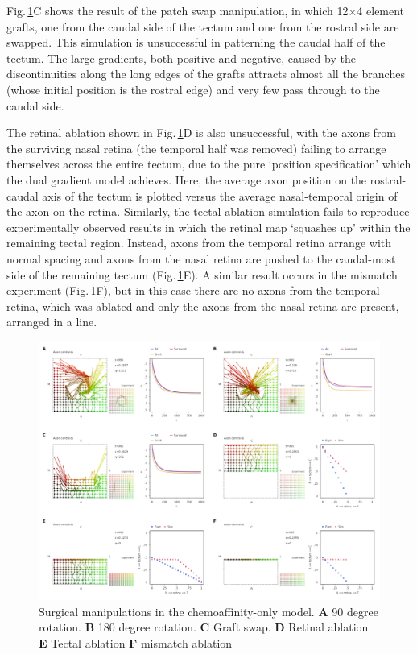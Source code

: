\documentclass[11pt, a4paper]{article}
\begin{document}
Fig.\,\ref{f:Gsurg}C shows the result of the patch swap manipulation, in
which 12$\times$4 element grafts, one from the caudal side of the tectum and one from
the rostral side are swapped. This simulation is unsuccessful in patterning
the caudal half of the tectum. The large gradients, both positive and
negative, caused by the discontinuities along the long edges of the grafts
attracts almost all the branches (whose initial position is the rostral edge)
and very few pass through to the caudal side.

The retinal ablation shown in Fig.\,\ref{f:Gsurg}D is also unsuccessful, with
the axons from the surviving nasal retina (the temporal half was removed)
failing to arrange themselves across the entire tectum, due to the pure
`position specification' which the dual gradient model achieves. Here, the
average axon position on the rostral-caudal axis of the tectum is plotted versus the average
nasal-temporal origin of the axon on the retina. Similarly,
the tectal ablation simulation fails to reproduce experimentally observed
results in which the retinal map `squashes up' within the remaining tectal
region. Instead, axons from the temporal retina arrange with normal spacing
and axons from the nasal retina are pushed to the caudal-most side of the
remaining tectum (Fig.\,\ref{f:Gsurg}E). A similar result occurs in the
mismatch experiment (Fig.\,\ref{f:Gsurg}F), but in this case there are no
axons from the temporal retina, which was ablated and only the axons
from the nasal retina are present, arranged in a line.

\begin{figure}
\includegraphics[width=0.95\linewidth]{./images/fig_chemo_manipulations.png}
\caption{Surgical manipulations in the chemoaffinity-only model. \textbf{A} 90 degree
rotation. \textbf{B} 180 degree rotation. \textbf{C} Graft swap. \textbf{D}
Retinal ablation \textbf{E} Tectal ablation \textbf{F} mismatch ablation}
\label{f:Gsurg}
\end{figure}
\end{document}

